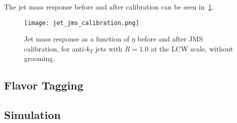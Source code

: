 The jet mass response before and after calibration can be seen in~\ref{fig:jet_jms_response}.

\begin{figure}[!ht]
    \centering
\texttt{[image: jet\_jms\_calibration.png]}
\caption{Jet mass response as a function of $\eta$ before and after JMS calibration, for anti-$k_T$ jets
with $R=1.0$ at the LCW scale, without grooming.}
\label{fig:jet_jms_response}
\end{figure}\cite{jet-substructure-perf}

\subsection{Flavor Tagging}\label{subsec:jet_flavor_tagging}
\subsection{Simulation}\label{subsec:jet_full_vs_fast_sim}